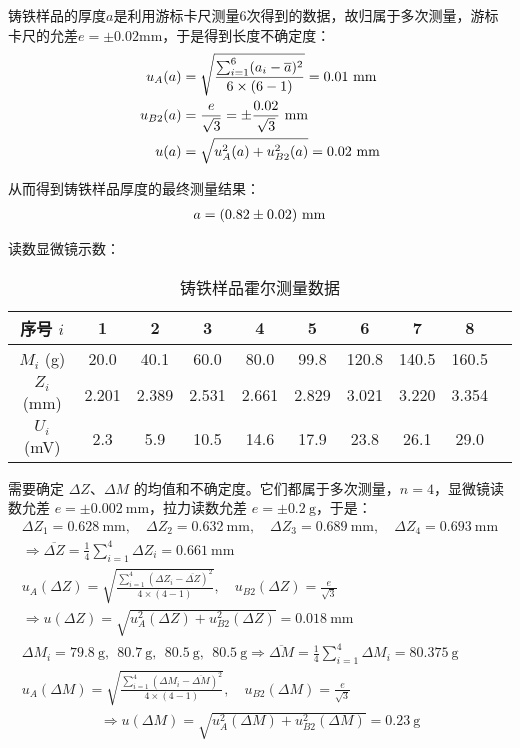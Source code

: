 \documentclass[11pt]{article}
\begin{document}
	铸铁样品的厚度$a$是利用游标卡尺测量6次得到的数据，故归属于多次测量，游标卡尺的允差$e=\pm 0.02$mm，于是得到长度不确定度：
	\begin{align*}
		u_A(a) &=\sqrt{\frac{\sum_{i=1}^6(a_i-\overline a)^2}{6\times(6-1)}}=0.01\,\,{\rm mm}\\
		u_{B2}(a) &=\frac{e}{\sqrt 3}=\pm \frac{0.02}{\sqrt 3} \,\,{\rm mm}\\
		u(a)&=
		\sqrt{u_{A}^2(a)+u^2_{B2}(a)} 
		=0.02 \,\,{\rm mm}
	\end{align*}
	
	从而得到铸铁样品厚度的最终测量结果：
	\begin{align*}
		a=(0.82\pm 0.02)\,\, {\rm mm} 
	\end{align*}
	
	读数显微镜示数：
	\begin{table}[H]\centering
		\caption{铸铁样品霍尔测量数据}
		\label{铸铁样品霍尔测量数据}
		\begin{tabular}{cccccccccc}\toprule
			序号 $i$ & 1 & 2 & 3 & 4 & 5 & 6 & 7 & 8  \\
			\midrule
			$M_i$ (g)   & 20.0 & 40.1 & 60.0 & 80.0 & 99.8 & 120.8 & 140.5 & 160.5    \\
			$Z_i$  (mm) & 2.201 & 2.389 & 2.531 & 2.661 & 2.829 & 3.021 & 3.220 & 3.354    \\
			$U_i$  (mV) & 2.3 & 5.9 & 10.5 & 14.6 & 17.9 & 23.8 & 26.1 & 29.0    \\
			\bottomrule
		\end{tabular}
	\end{table}
	
	需要确定 $\Delta Z$、$\Delta M$ 的均值和不确定度。它们都属于多次测量，$n = 4$，显微镜读数允差 $e = \pm 0.002 \ \mathrm{mm}$，拉力读数允差 $e = \pm 0.2 \ \mathrm{g}$，于是：
	\begin{gather*}
		\Delta Z_1 = 0.628 \ \mathrm{mm},\quad \Delta Z_2 = 0.632\ \mathrm{mm},\quad \Delta Z_3 = 0.689 \ \mathrm{mm},\quad \Delta Z_4 = 0.693 \ \mathrm{mm} \\ 
		\Longrightarrow
		\overline{\Delta Z} = \frac{1}{4}\sum_{i=1}^{4}\Delta Z_i = 0.661 \ \mathrm{mm} \\ 
		u_A(\Delta Z) = \sqrt{\frac{\sum_{i=1}^{4}\left(\Delta Z_i - \overline{\Delta Z}\right)^2}{4\times (4 - 1)}} ,\quad u_{B2}(\Delta Z) =  \frac{e}{\sqrt{3}} \\ 
		\Longrightarrow u(\Delta Z) = \sqrt{u_A^2(\Delta Z) + u_{B2}^2(\Delta Z)} = 0.018 \ \mathrm{mm} 
		\\ 
		\Delta M_i = 79.8 \ \mathrm{g},\ \  80.7 \ \mathrm{g},\ \  80.5 \ \mathrm{g},\ \  80.5\ \mathrm{g} 
		\Longrightarrow
		\overline{\Delta M} = \frac{1}{4}\sum_{i=1}^{4}\Delta M_i = 80.375 \ \mathrm{g} \\ 
		u_A(\Delta M) = \sqrt{\frac{\sum_{i=1}^{4}\left(\Delta M_i - \overline{\Delta M}\right)^2}{4\times (4 - 1)}} ,\quad u_{B2}(\Delta M) =  \frac{e}{\sqrt{3}}
	\end{gather*}
	\begin{gather*}
		\Longrightarrow u(\Delta M) = \sqrt{u_A^2(\Delta M) + u_{B2}^2(\Delta M)} = 0.23 \ \mathrm{g}
	\end{gather*}
	
\end{document}
